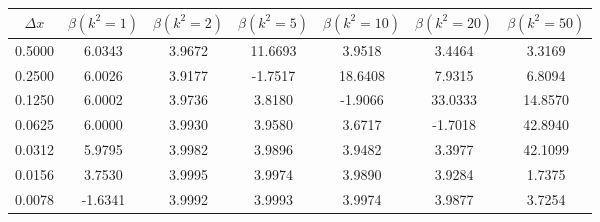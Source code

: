 \begin{tabular}{|c|c|c|c|c|c|c|}
\hline
\textbf{$\Delta x$}&\textbf{$\beta(k^2=1)$}&\textbf{$\beta(k^2=2)$}&\textbf{$\beta(k^2=5)$}&\textbf{$\beta(k^2=10)$}&\textbf{$\beta(k^2=20)$}&\textbf{$\beta(k^2=50)$}\\\hline
0.5000&6.0343&3.9672&11.6693&3.9518&3.4464&3.3169\\\hline
0.2500&6.0026&3.9177&-1.7517&18.6408&7.9315&6.8094\\\hline
0.1250&6.0002&3.9736&3.8180&-1.9066&33.0333&14.8570\\\hline
0.0625&6.0000&3.9930&3.9580&3.6717&-1.7018&42.8940\\\hline
0.0312&5.9795&3.9982&3.9896&3.9482&3.3977&42.1099\\\hline
0.0156&3.7530&3.9995&3.9974&3.9890&3.9284&1.7375\\\hline
0.0078&-1.6341&3.9992&3.9993&3.9974&3.9877&3.7254\\\hline
\end{tabular}
